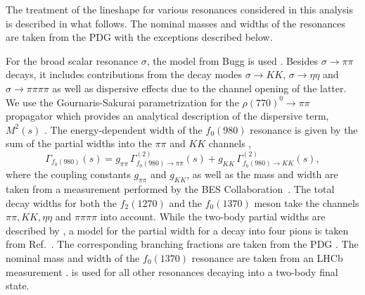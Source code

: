 The treatment of the lineshape for various resonances considered in this analysis is described in what follows.
The nominal masses and widths of the resonances are taken from the PDG \cite{PDG2016} with the exceptions described below.

 For the broad scalar resonance $\sigma$,
     		the model from Bugg is used \cite{BuggSigma}.
		Besides $\sigma \to \pi \pi$ decays, it includes contributions from the decay modes $\sigma \to K K$, $\sigma \to \eta \eta$ and $\sigma \to \pi \pi \pi \pi$ 
		as well as dispersive effects 
		due to the channel opening of the latter.
	We use the Gournaris-Sakurai parametrization for the $\rho(770)^{0} \to \pi \pi$ propagator which provides an analytical description of the dispersive term, $M^{2}(s)$  \cite{GS}.
	The energy-dependent width of the $f_{0}(980)$ resonance is given by the sum of the partial widths into the $\pi\pi$ and $KK$ channels \cite{Flatte},
		\begin{equation}
			\Gamma_{f_{0}(980)}(s) = g_{\pi\pi} \, \Gamma^{(2)}_{f_{0}(980) \to \pi \pi}(s) + g_{KK} \, \Gamma^{(2)}_{f_{0}(980) \to KK}(s),
		\end{equation}
		where the coupling constants $g_{\pi\pi}$ and $g_{KK}$, as well as the mass and width are taken from a measurement performed by the BES Collaboration~\cite{Flatte2}.
	        The total decay widths for both the $f_{2}(1270)$ and the $f_{0}(1370)$ meson take the channels $\pi  \pi, K  K, \eta  \eta$ and $\pi \pi \pi \pi$ into account. 
		While the two-body partial widths are described by , a model for the partial width for a decay into four pions is taken from Ref.~\cite{Buggf0}.
		The corresponding branching fractions are taken from the PDG \cite{PDG2016}.
		The nominal mass and width of the $f_{0}(1370)$ resonance are taken from an LHCb measurement \cite{LHCb:2012ae}.
		 is used for all other resonances decaying into a two-body final state.

